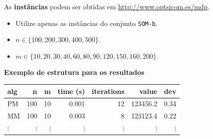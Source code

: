 \begin{exercise}
As \textbf{instâncias} podem ser obtidas em \url{http://www.optsicom.es/mdp}.
\begin{itemize}
	\item Utilize apenas as instâncias do conjunto \texttt{SOM-b}.
	\item $n \in \{100, 200, 300, 400, 500\}$.
	\item $m \in \{10, 20, 30, 40, 60, 80, 90, 120, 150, 160, 200\}$.
\end{itemize}

\insertspace

\textbf{Exemplo de estrutura para os resultados}

\begin{table}[h]
	\centering
	\begin{tabular}{lrrrrrr}
		\hline
		\textbf{alg} & \textbf{n} & \textbf{m} & \textbf{time (s)} & \textbf{iterations} & \textbf{value} & \textbf{dev} \\
		\hline
		PM & 100 & 10 & 0.001 & 12 & 123456.2 & 0.34 \\
		MM & 100 & 10 & 0.003 & 8 & 123123.4 & 0.22 \\
		$\vdots$ & $\vdots$ & $\vdots$ & $\vdots$ & $\vdots$ & $\vdots$ & $\vdots$ \\
		\hline
	\end{tabular}
\end{table}
\end{exercise}

